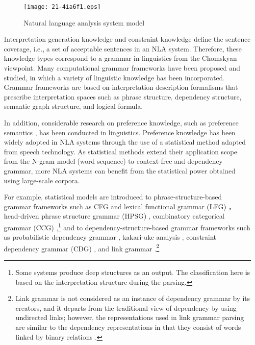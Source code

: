 \documentclass[english]{jnlp_1.4_rep}
\theoremstyle{break}
\theoremstyle{plain}
\theoremstyle{plain}
\begin{document}
\begin{figure}[t]
\begin{center}
\texttt{[image: 21-4ia6f1.eps]}
\end{center}
\caption{Natural language analysis system model}
\label{fig:NLAnalysisModel}
\vspace{-0.7\Cvs}
\end{figure}

Interpretation generation knowledge and constraint knowledge
define the sentence coverage, i.e., a set of acceptable sentences in
an NLA system. Therefore, these knowledge types correspond to a grammar in
linguistics from the Chomskyan viewpoint. Many computational grammar
frameworks have been proposed and studied, in which a variety of linguistic
knowledge has been incorporated. Grammar frameworks are based on
interpretation description formalisms that prescribe interpretation
spaces such as phrase structure, dependency structure, semantic graph
structure, and logical formula.

In addition, considerable research on preference knowledge, such as
preference semantics \cite{Wilks75}, has been conducted in
linguistics. Preference knowledge has been widely adopted in NLA
systems through the use of a statistical method adapted from speech
technology. As statistical methods extend their application scope from
the N-gram model (word sequence) to context-free and
dependency grammar, more NLA systems can benefit from the
statistical power obtained using large-scale corpora.

For example, statistical models are introduced to
phrase-structure-based grammar frameworks such as CFG and lexical
functional grammar (LFG) \cite{Kaplan89,Riezler02}，head-driven
phrase structure grammar (HPSG) \cite{Pollard94,Tsuruoka04},
combinatory categorical grammar (CCG)
\cite{Steedman00,Clark03},\footnote{Some systems produce deep
  structures as an output. The classification here is based on the
  interpretation structure during the parsing.} and to
dependency-structure-based grammar frameworks such as probabilistic
dependency grammar \cite{Lee97}, kakari-uke analysis
\cite{Shudo80,Ozeki94,Hirakawa01,Kudo05_e,Kawahara05_e}, 
constraint dependency grammar (CDG) \cite{Maruyama90,Wang04}, and link grammar
\cite{Sleator91,Lafferty92}.\footnote{Link grammar is not considered as
an instance of dependency grammar by its creators, and it departs from
the traditional view of dependency by using undirected links; however,
the representations used in link grammar parsing are similar to the
dependency representations in that they consist of words linked by
binary relations \cite{nivre2005dga}.}
\end{document}

